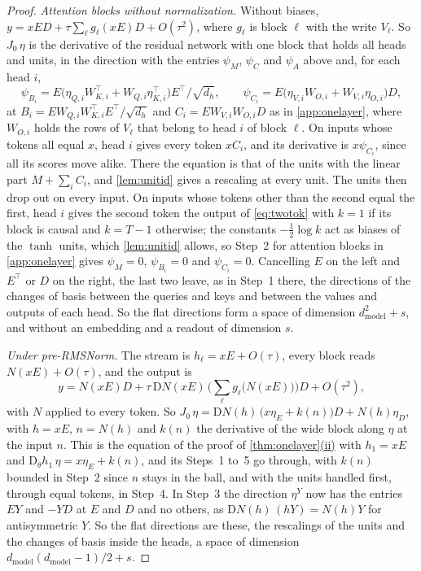 \documentclass[10pt]{article}
\theoremstyle{definition}
\theoremstyle{remark}
\newcommand{\dm}{d_{\mathrm{model}}}
\newcommand{\Der}{\mathrm{D}}
\DeclareRobustCommand{\cpref}[2]{\hyperref[#1:#2]{\cref*{#1}(#2)}}
\begin{document}
\begin{proof}
\emph{Attention blocks without normalization.} Without biases, $y = xED + \tau\sum_\ell g_\ell(xE)D + O(\tau^2)$, where $g_\ell$ is block $\ell$ with the write $V_\ell$. So $J_0\,\eta$ is the derivative of the residual network with one block that holds all heads and units, in the direction with the entries $\psi_M$, $\psi_C$ and $\psi_A$ above and, for each head $i$,
\[
\psi_{B_i} = E\big(\eta_{Q,i}W_{K,i}^\top + W_{Q,i}\eta_{K,i}^\top\big)E^\top/\sqrt{d_h},\qquad \psi_{C_i} = E\big(\eta_{V,i}W_{O,i} + W_{V,i}\eta_{O,i}\big)D,
\]
at $B_i = EW_{Q,i}W_{K,i}^\top E^\top/\sqrt{d_h}$ and $C_i = EW_{V,i}W_{O,i}D$ as in \cref{app:onelayer}, where $W_{O,i}$ holds the rows of $V_\ell$ that belong to head $i$ of block $\ell$. On inputs whose tokens all equal $x$, head $i$ gives every token $xC_i$, and its derivative is $x\psi_{C_i}$, since all its scores move alike. There the equation is that of the units with the linear part $M + \sum_iC_i$, and \cref{lem:unitid} gives a rescaling at every unit. The units then drop out on every input. On inputs whose tokens other than the second equal the first, head $i$ gives the second token the output of \cref{eq:twotok} with $k = 1$ if its block is causal and $k = T - 1$ otherwise; the constants $-\tfrac12\log k$ act as biases of the $\tanh$ units, which \cref{lem:unitid} allows, so Step~2 for attention blocks in \cref{app:onelayer} gives $\psi_M = 0$, $\psi_{B_i} = 0$ and $\psi_{C_i} = 0$. Cancelling $E$ on the left and $E^\top$ or $D$ on the right, the last two leave, as in Step~1 there, the directions of the changes of basis between the queries and keys and between the values and outputs of each head. So the flat directions form a space of dimension $\dm^2 + s$, and without an embedding and a readout of dimension $s$.

\emph{Under pre-RMSNorm.} The stream is $h_\ell = xE + O(\tau)$, every block reads $N(xE) + O(\tau)$, and the output is
\[
y = N(xE)D + \tau\,\Der N(xE)\,\Big(\textstyle\sum_\ell g_\ell\big(N(xE)\big)\Big)D + O(\tau^2),
\]
with $N$ applied to every token. So $J_0\,\eta = \Der N(h)\,\big(x\eta_E + k(n)\big)D + N(h)\eta_D$, with $h = xE$, $n = N(h)$ and $k(n)$ the derivative of the wide block along $\eta$ at the input $n$. This is the equation of the proof of \cpref{thm:onelayer}{ii} with $h_1 = xE$ and $\Der_\theta h_1\,\eta = x\eta_E + k(n)$, and its Steps~1 to~5 go through, with $k(n)$ bounded in Step~2 since $n$ stays in the ball, and with the units handled first, through equal tokens, in Step~4. In Step~3 the direction $\eta^Y$ now has the entries $EY$ and $-YD$ at $E$ and $D$ and no others, as $\Der N(h)\,(hY) = N(h)Y$ for antisymmetric $Y$. So the flat directions are these, the rescalings of the units and the changes of basis inside the heads, a space of dimension $\dm(\dm-1)/2 + s$.


\end{proof}
\end{document}
